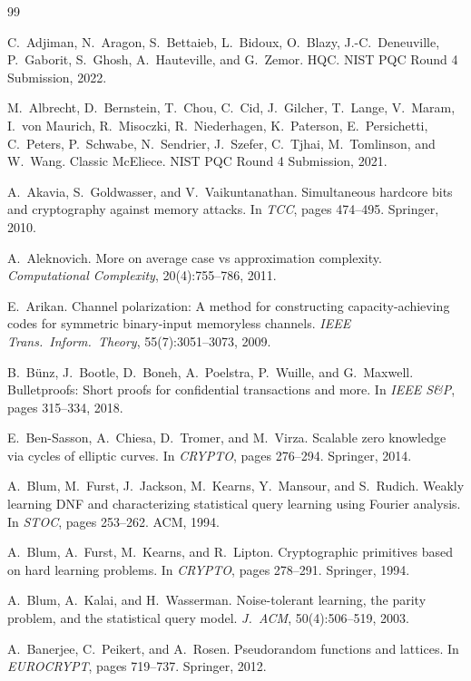 \documentclass[11pt,a4paper]{article}
\theoremstyle{plain}
\theoremstyle{definition}
\begin{document}
\begin{thebibliography}{99}

C.~Adjiman, N.~Aragon, S.~Bettaieb, L.~Bidoux, O.~Blazy, J.-C.~Deneuville, P.~Gaborit, S.~Ghosh, A.~Hauteville, and G.~Zemor.
HQC.
NIST PQC Round 4 Submission, 2022.

M.~Albrecht, D.~Bernstein, T.~Chou, C.~Cid, J.~Gilcher, T.~Lange, V.~Maram, I.~von Maurich, R.~Misoczki, R.~Niederhagen, K.~Paterson, E.~Persichetti, C.~Peters, P.~Schwabe, N.~Sendrier, J.~Szefer, C.~Tjhai, M.~Tomlinson, and W.~Wang.
Classic McEliece.
NIST PQC Round 4 Submission, 2021.

A.~Akavia, S.~Goldwasser, and V.~Vaikuntanathan.
Simultaneous hardcore bits and cryptography against memory attacks.
In \emph{TCC}, pages 474--495. Springer, 2010.

A.~Aleknovich.
More on average case vs approximation complexity.
\emph{Computational Complexity}, 20(4):755--786, 2011.

E.~Arikan.
Channel polarization: A method for constructing capacity-achieving codes for symmetric binary-input memoryless channels.
\emph{IEEE Trans.\ Inform.\ Theory}, 55(7):3051--3073, 2009.

B.~B\"unz, J.~Bootle, D.~Boneh, A.~Poelstra, P.~Wuille, and G.~Maxwell.
Bulletproofs: Short proofs for confidential transactions and more.
In \emph{IEEE S\&P}, pages 315--334, 2018.

E.~Ben-Sasson, A.~Chiesa, D.~Tromer, and M.~Virza.
Scalable zero knowledge via cycles of elliptic curves.
In \emph{CRYPTO}, pages 276--294. Springer, 2014.

A.~Blum, M.~Furst, J.~Jackson, M.~Kearns, Y.~Mansour, and S.~Rudich.
Weakly learning DNF and characterizing statistical query learning using Fourier analysis.
In \emph{STOC}, pages 253--262. ACM, 1994.

A.~Blum, A.~Furst, M.~Kearns, and R.~Lipton.
Cryptographic primitives based on hard learning problems.
In \emph{CRYPTO}, pages 278--291. Springer, 1994.

A.~Blum, A.~Kalai, and H.~Wasserman.
Noise-tolerant learning, the parity problem, and the statistical query model.
\emph{J.\ ACM}, 50(4):506--519, 2003.

A.~Banerjee, C.~Peikert, and A.~Rosen.
Pseudorandom functions and lattices.
In \emph{EUROCRYPT}, pages 719--737. Springer, 2012.


\end{thebibliography}
\end{document}
